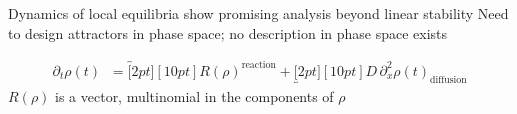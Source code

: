 \documentclass[a0,portrait]{a0poster}
\begin{document}
\begin{itemize}[leftmargin=5cm]
	\up Dynamics of local equilibria show promising analysis beyond linear stability \cite{Halatek2018}
	\down Need to design attractors in phase space; no description in phase space exists
\end{itemize}

\begin{align*}
	\partial_t\rho(t)\;\;=
	\overbracket[2pt][10pt]{R(\rho)}^{\text{reaction}}+
	\underbracket[2pt][10pt]{D\,\partial_x^2\rho(t)}_{\text{diffusion}}
\end{align*}
$R(\rho)$ is a vector, multinomial in the components of $\rho$

\vfill\normalsize

\begin{minipage}[t][][b]{0.99\textwidth}
	
	
\end{minipage}
\end{document}
